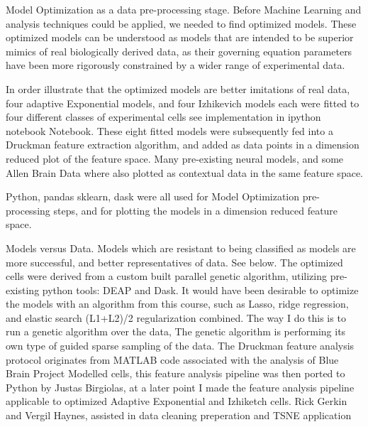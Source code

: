 Model Optimization as a data pre-processing stage.
Before Machine Learning and analysis techniques could be applied, we needed to find optimized models. These optimized models can be understood as models that are intended to be superior mimics of real biologically derived data, as their governing equation parameters have been more rigorously constrained by a wider range of experimental data.

In order illustrate that the optimized models are better imitations of real data, four adaptive Exponential models, and four Izhikevich models each were fitted to four different classes of experimental cells see implementation in ipython notebook Notebook. These eight fitted models were subsequently fed into a Druckman feature extraction algorithm, and added as data points in a dimension reduced plot of the feature space. Many pre-existing neural models, and some Allen Brain Data where also plotted as contextual data in the same feature space.

Python, pandas sklearn, dask were all used for Model Optimization pre-processing steps, and for plotting the models in a dimension reduced feature space.

Models versus Data. Models which are resistant to being classified as models are more successful, and better representatives of data. See below.
The optimized cells were derived from a custom built parallel genetic algorithm, utilizing pre-existing python tools: DEAP and Dask. It would have been desirable to optimize the models with an algorithm from this course, such as Lasso, ridge regression, and elastic search (L1+L2)/2 regularization combined. The way I do this is to run a genetic algorithm over the data, The genetic algorithm is performing its own type of guided sparse sampling of the data.
The Druckman feature analysis protocol originates from MATLAB code associated with the analysis of Blue Brain Project Modelled cells, this feature analysis pipeline was then ported to Python by Justas Birgiolas, at a later point I made the feature analysis pipeline applicable to optimized Adaptive Exponential and Izhiketch cells. Rick Gerkin and Vergil Haynes, assisted in data cleaning preperation and TSNE application

